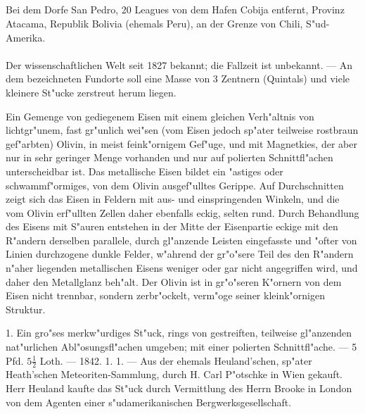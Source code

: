 \documentclass[a4paper, 11pt, oneside, polutonikogreek, german]{article}
\begin{document}
\subsection[\swabfamily {--- Meteoreisen --- Nr. 70 bis 94. --- Atacama.}]{}
\begin{center}

Bei dem Dorfe San Pedro, 20 Leagues von dem Hafen Cobija entfernt, Provinz Atacama, Republik Bolivia (ehemals Peru), an der Grenze von Chili, S"ud-Amerika.
\end{center}
\paragraph{}
Der wissenschaftlichen Welt seit 1827 bekannt; die Fallzeit ist unbekannt. --- An dem bezeichneten Fundorte soll eine Masse von 3 Zentnern (Quintals) und viele kleinere St"ucke zerstreut herum liegen.

Ein Gemenge von gediegenem Eisen mit einem gleichen Verh"altnis von lichtgr"unem, fast gr"unlich wei"sen (vom Eisen jedoch sp"ater teilweise rostbraun gef"arbten) Olivin, in meist feink"ornigem Gef"uge, und mit Magnetkies, der aber nur in sehr geringer Menge vorhanden und nur auf polierten Schnittfl"achen unterscheidbar ist. Das metallische Eisen bildet ein "astiges oder schwammf"ormiges, von dem Olivin ausgef"ulltes Gerippe. Auf Durchschnitten zeigt sich das Eisen in Feldern mit aus- und einspringenden Winkeln, und die vom Olivin erf"ullten Zellen daher ebenfalls eckig, selten rund. Durch Behandlung des Eisens mit S"auren entstehen in der Mitte der Eisenpartie eckige mit den R"andern derselben parallele, durch gl"anzende Leisten eingefasste und "ofter von Linien durchzogene dunkle Felder, w"ahrend der gr"o"sere Teil des den R"andern n"aher liegenden metallischen Eisens weniger oder gar nicht angegriffen wird, und daher den Metallglanz beh"alt. Der Olivin ist in gr"o"seren K"ornern von dem Eisen nicht trennbar, sondern zerbr"ockelt, verm"oge seiner kleink"ornigen Struktur.

1. Ein gro"ses merkw"urdiges St"uck, rings von gestreiften, teilweise gl"anzenden nat"urlichen Abl"osungsfl"achen umgeben; mit einer polierten Schnittfl"ache. --- 5 Pfd. $\mathfrak{5\frac{1}{2}}$ Loth. --- 1842. 1. 1. --- Aus der ehemals Heuland'schen, sp"ater Heath'schen Meteoriten-Sammlung, durch H. Carl P"otschke in Wien gekauft. Herr Heuland kaufte das St"uck durch Vermittlung des Herrn Brooke in London von dem Agenten einer s"udamerikanischen Bergwerksgesellschaft.
\end{document}
